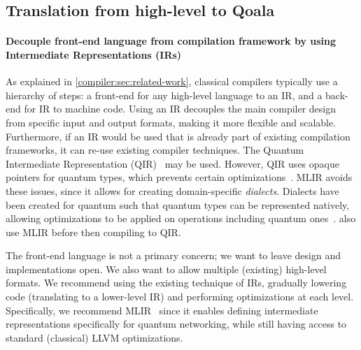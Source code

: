 \subsection{Translation from high-level to Qoala}
\label{compiler:sec:translation}

\paragraph{Decouple front-end language from compilation framework by using Intermediate Representations (IRs)}

As explained in \cref{compiler:sec:related-work}, classical compilers typically use a hierarchy of steps: a front-end for any high-level language to an \acf{IR}, and a back-end for \ac{IR} to machine code.
Using an \ac{IR} decouples the main compiler design from specific input and output formats, making it more flexible and scalable.
Furthermore, if an \ac{IR} would be used that is already part of existing compilation frameworks, it can re-use existing compiler techniques.
The Quantum Intermediate Representation (QIR)~\cite{haner_software_2018, geller_introducing_2020} may be used.
However, QIR uses opaque pointers for quantum types, which prevents certain optimizations~\cite{ittah_enabling_2022, peduri_qssa_2022}.
\acf{MLIR} avoids these issues, since it allows for creating domain-specific \emph{dialects}.
Dialects have been created for quantum such that quantum types can be represented natively, allowing optimizations to be applied on operations including quantum ones~\cite{ittah_enabling_2022, peduri_qssa_2022}.
\cite{mccaskey_mlir_2021, nguyen_retargetable_2022} also use \ac{MLIR} before then compiling to QIR.

The front-end language is not a primary concern; we want to leave design and implementations open.
We also want to allow multiple (existing) high-level formats.
We recommend using the existing technique of IRs, gradually lowering code (translating to a lower-level IR) and performing optimizations at each level.
Specifically, we recommend \ac{MLIR}~\cite{lattner_mlir_2020} since it enables defining intermediate representations specifically for quantum networking, while still having access to standard (classical) LLVM optimizations.

